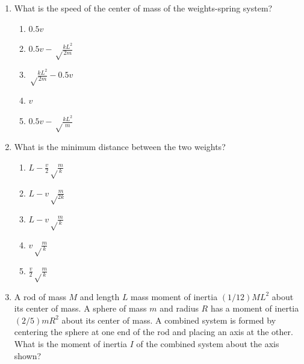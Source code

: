 \documentclass[12pt,letterpaper]{article}
\begin{document}
\begin{enumerate}[resume]
\item
What is the speed of the center of mass of the weights-spring system?
\begin{enumerate}
\item $0.5v$
\item $\displaystyle 0.5v - \sqrt\frac{kL^2}{2m}$
\item $\displaystyle \sqrt\frac{kL^2}{2m} - 0.5v$
\item $v$
\item $0.5v - \sqrt\frac{kL^2}{m}$
\end{enumerate}

\item
What is the minimum distance between the two weights?
\begin{enumerate}
\item $\displaystyle L - \frac{v}{2}\sqrt\frac{m}{k}$
\item $\displaystyle L - v\sqrt\frac{m}{2k}$
\item $\displaystyle L - v\sqrt\frac{m}{k}$
\item $\displaystyle v\sqrt\frac{m}{k}$
\item $\displaystyle \frac{v}{2}\sqrt\frac{m}{k}$
\end{enumerate}

\item
A rod of mass $M$ and length $L$ mass moment of inertia $\left(1/12\right)ML^2$ about its center of mass. A sphere of mass $m$ and radius $R$ has a moment of inertia $\left(2/5\right)mR^2$ about its center of mass. A combined system is formed by centering the sphere at one end of the rod and placing an axis at the other. What is the moment of inertia $I$ of the combined system about the axis shown?

\begin{tabular}{l r}


\end{tabular}
\end{enumerate}
\end{document}
